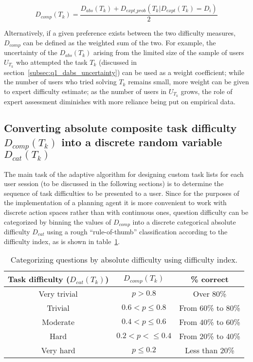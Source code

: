 \begin{equation}
    D_{comp}(T_k) = \frac{D_{abs}(T_k) + D_{expt\_prob}(T_k | D_{expt}(T_k) = D_i)} {2}
\end{equation}

Alternatively, if a given preference exists between the two difficulty measures, $D_{comp}$ can be defined as the weighted sum of the two.
For example, the uncertainty of the $D_{abs}(T_k)$ arising from the limited size of the sample of users $U_{T_k}$ who attempted the task $T_k$ (discussed in section~\ref{subsec:q1_dabs_uncertainty}) can be used as a weight coefficient;
while the number of users who tried solving $T_k$ remains small, more weight can be given to expert difficulty estimate;
as the number of users in $U_{T_k}$ grows, the role of expert assessment diminishes with more reliance being put on empirical data.

\subsection{Converting absolute composite task difficulty $D_{comp}(T_k)$ into a discrete random variable $D_{cat}(T_k)$} \label{subsec:q2_discrete_conversion}

The main task of the adaptive algorithm for designing custom task lists for each user session (to be discussed in the following sections) is to determine the sequence of task difficulties to be presented to a user.
Since for the purposes of the implementation of a planning agent it is more convenient to work with discrete action spaces rather than with continuous ones, question difficulty can be categorized by binning the values of $D_{comp}$ into a discrete categorical absolute difficulty $D_{cat}$ using a rough ``rule-of-thumb'' classification according to the difficulty index, as is shown in table~\ref{tab:difficulty_index}.

\begin{table}[h!]
    \centering
    \begin{tabular}{ c | c | c }
        \toprule
        \hline
        Task difficulty ($D_{cat}(T_k)$) & $D_{comp}(T_k)$ & \% correct \\
        \midrule
        \hline
        Very trivial & $p > 0.8$ & Over 80\% \\
        \hline
        Trivial & $0.6 < p \leq 0.8$ & From 60\% to 80\% \\
        \hline
        Moderate & $0.4 < p \leq 0.6$ & From 40\% to 60\% \\
        \hline
        Hard & $0.2 < p < \leq 0.4$ & From 20\% to 40\% \\
        \hline
        Very hard & $p \leq 0.2$ & Less than 20\% \\
        \hline
        \bottomrule
    \end{tabular}
    \caption{Categorizing questions by absolute difficulty using difficulty index.}
    \label{tab:difficulty_index}
\end{table}


